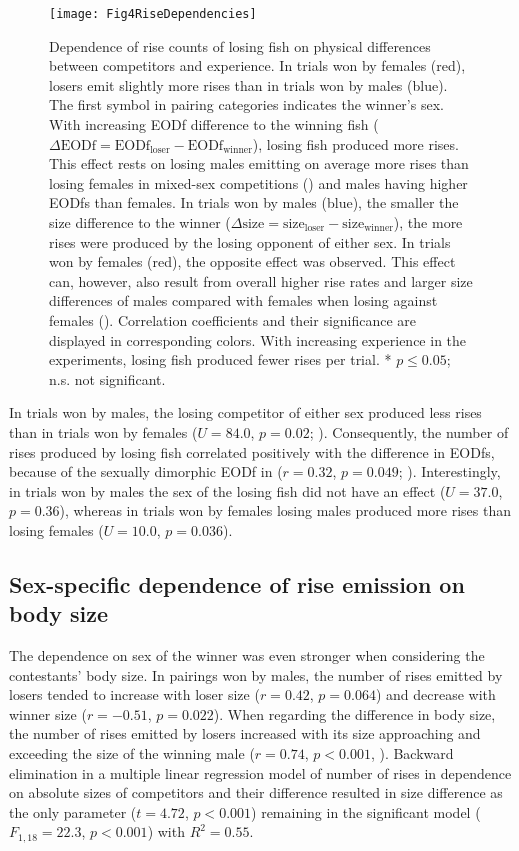 \begin{figure}[tp]
  \centerline{\texttt{[image: Fig4RiseDependencies]}}
  \caption{\label{risefactors} Dependence of rise counts of losing fish on physical differences between competitors and experience.  In trials won by females (red), losers emit slightly more rises than in trials won by males (blue). The first symbol in pairing categories indicates the winner's sex.  With increasing EODf difference to the winning fish ($\Delta\text{EODf} = \text{EODf}_{\text{loser}} - \text{EODf}_{\text{winner}}$), losing fish produced more rises. This effect rests on losing males emitting on average more rises than losing females in mixed-sex competitions () and males having higher EODfs than females.  In trials won by males (blue), the smaller the size difference to the winner ($\Delta\text{size} = \text{size}_{\text{loser}} - \text{size}_{\text{winner}}$), the more rises were produced by the losing opponent of either sex. In trials won by females (red), the opposite effect was observed. This effect can, however, also result from overall higher rise rates and larger size differences of males compared with females when losing against females (). Correlation coefficients and their significance are displayed in corresponding colors.  With increasing experience in the experiments, losing fish produced fewer rises per trial. * $p \leq 0.05$; n.s. not significant.}
\end{figure}

In trials won by males, the losing competitor of either sex produced less rises than in trials won by females ($U=84.0$, $p=0.02$; ). Consequently, the number of rises produced by losing fish correlated positively with the difference in EODfs, because of the sexually dimorphic EODf in \lepto{} ($r=0.32$, $p=0.049$; ). Interestingly, in trials won by males the sex of the losing fish did not have an effect ($U=37.0$, $p=0.36$), whereas in trials won by females losing males produced more rises than losing females ($U=10.0$, $p=0.036$).

\subsection{Sex-specific dependence of rise emission on body size}
The dependence on sex of the winner was even stronger when considering the contestants' body size. In pairings won by males, the number of rises emitted by losers tended to increase with loser size ($r=0.42$, $p=0.064$) and decrease with winner size ($r=-0.51$, $p=0.022$). When regarding the difference in body size, the number of rises emitted by losers increased with its size approaching and exceeding the size of the winning male ($r=0.74$, $p<0.001$, ). Backward elimination in a multiple linear regression model of number of rises in dependence on absolute sizes of competitors and their difference resulted in size difference as the only parameter ($t=4.72$, $p<0.001$) remaining in the significant model ($F_{1,18}=22.3$, $p<0.001$) with $R^2=0.55$.


